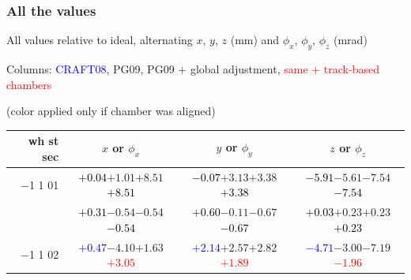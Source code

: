 \documentclass[compress]{beamer}
\begin{document}
\begin{frame}
\frametitle{All the values}
\tiny

All values relative to ideal, alternating $x$, $y$, $z$ (mm) and $\phi_x$, $\phi_y$, $\phi_z$ (mrad)

Columns: \textcolor{blue}{CRAFT08}, PG09, PG09 $+$ global adjustment, \textcolor{red}{same $+$ track-based chambers}

\hfill (color applied only if chamber was aligned)

\vfill
\renewcommand{\arraystretch}{1.1}
\begin{tabular}{r | c | c | c}
wh st sec & $x$ or $\phi_x$ & $y$ or $\phi_y$ & $z$ or $\phi_z$ \\\hline
$-$1 1 01 & \textcolor{black}{$+0.04$}\hspace{0.1 cm}$+1.01$\hspace{0.1 cm}$+8.51$\hspace{0.1 cm}\textcolor{black}{$+8.51$} & \textcolor{black}{$-0.07$}\hspace{0.1 cm}$+3.13$\hspace{0.1 cm}$+3.38$\hspace{0.1 cm}\textcolor{black}{$+3.38$} & \textcolor{black}{$-5.91$}\hspace{0.1 cm}$-5.61$\hspace{0.1 cm}$-7.54$\hspace{0.1 cm}\textcolor{black}{$-7.54$} \\
          & \textcolor{black}{$+0.31$}\hspace{0.1 cm}$-0.54$\hspace{0.1 cm}$-0.54$\hspace{0.1 cm}\textcolor{black}{$-0.54$} & \textcolor{black}{$+0.60$}\hspace{0.1 cm}$-0.11$\hspace{0.1 cm}$-0.67$\hspace{0.1 cm}\textcolor{black}{$-0.67$} & \textcolor{black}{$+0.03$}\hspace{0.1 cm}$+0.23$\hspace{0.1 cm}$+0.23$\hspace{0.1 cm}\textcolor{black}{$+0.23$} \\
$-$1 1 02 & \textcolor{blue}{$+0.47$}\hspace{0.1 cm}$-4.10$\hspace{0.1 cm}$+1.63$\hspace{0.1 cm}\textcolor{red}{$+3.05$} & \textcolor{blue}{$+2.14$}\hspace{0.1 cm}$+2.57$\hspace{0.1 cm}$+2.82$\hspace{0.1 cm}\textcolor{red}{$+1.89$} & \textcolor{blue}{$-4.71$}\hspace{0.1 cm}$-3.00$\hspace{0.1 cm}$-7.19$\hspace{0.1 cm}\textcolor{red}{$-1.96$} \\

\end{tabular}
\end{frame}
\end{document}
